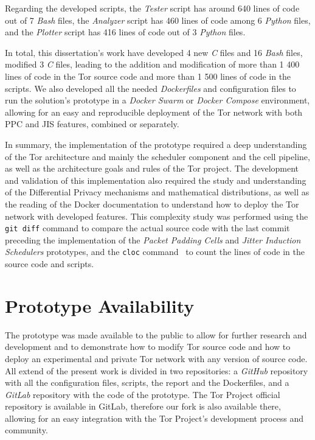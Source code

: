 Regarding the developed scripts, the \textit{Tester} script has around 640 lines of code out of 7 \textit{Bash} files, the \textit{Analyzer} script has 460 lines of code among 6 \textit{Python} files, and the \textit{Plotter} script has 416 lines of code out of 3 \textit{Python} files.

In total, this dissertation's work have developed 4 new \textit{C} files and 16 \textit{Bash} files, modified 3 \textit{C} files, leading to the addition and modification of more than 1 400 lines of code in the Tor source code and more than 1 500 lines of code in the scripts. We also developed all the needed \textit{Dockerfiles} and configuration files to run the solution's prototype in a \textit{Docker Swarm} or \textit{Docker Compose} environment, allowing for an easy and reproducible deployment of the Tor network with both PPC and JIS features, combined or separately.

In summary, the implementation of the prototype required a deep understanding of the Tor architecture and mainly the scheduler component and the cell pipeline, as well as the architecture goals and rules of the Tor project. The development and validation of this implementation also required the study and understanding of the Differential Privacy mechanisms and mathematical distributions, as well as the reading of the Docker documentation to understand how to deploy the Tor network with developed features. This complexity study was performed using the \texttt{git diff} command to compare the actual source code with the last commit preceding the implementation of the \textit{Packet Padding Cells} and \textit{Jitter Induction Schedulers} prototypes, and the \texttt{cloc} command~\cite{adanial_cloc} to count the lines of code in the source code and scripts. 


\section{Prototype Availability}\label{sec:prototype_availability}

The prototype was made available to the public to allow for further research and development and to demonstrate how to modify Tor source code and how to deploy an experimental and private Tor network with any version of source code. All  extend of the present work is divided in two repositories: a \textit{GitHub} repository with all the configuration files, scripts, the report and the Dockerfiles, and a \textit{GitLab} repository with the code of the prototype. The Tor Project official repository is available in GitLab, therefore our fork is also available there, allowing for an easy integration with the Tor Project's development process and community.

